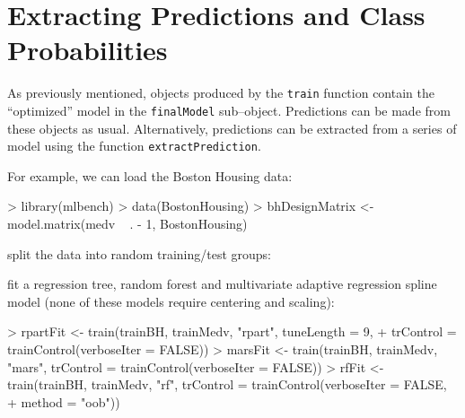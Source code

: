 \documentclass[12pt]{article}
\begin{document}
\clearpage

\section{Extracting Predictions and Class Probabilities}

As previously mentioned, objects produced by the \texttt{train} function contain the ``optimized'' model in the \texttt{finalModel} sub--object. Predictions can be made from these objects as usual. Alternatively, predictions can be extracted from a series of model using the function \texttt{extractPrediction}.

For example, we can load the Boston Housing data:

\begin{small}
\begin{Schunk}
\begin{Sinput}
> library(mlbench)
> data(BostonHousing)
> bhDesignMatrix <- model.matrix(medv ~ . - 1, BostonHousing)
\end{Sinput}
\end{Schunk}
\end{small}

\noindent split the data into random training/test groups:

\begin{small}
\begin{Schunk}
\end{Schunk}
\end{small}

\noindent fit a regression tree, random forest and multivariate adaptive regression spline model (none of these  models require centering and scaling):

\begin{small}
\begin{Schunk}
\begin{Sinput}
> rpartFit <- train(trainBH, trainMedv, "rpart", tuneLength = 9, 
+     trControl = trainControl(verboseIter = FALSE))
> marsFit <- train(trainBH, trainMedv, "mars", trControl = trainControl(verboseIter = FALSE))
> rfFit <- train(trainBH, trainMedv, "rf", trControl = trainControl(verboseIter = FALSE, 
+     method = "oob"))
\end{Sinput}
\end{Schunk}
\end{small}
\end{document}
